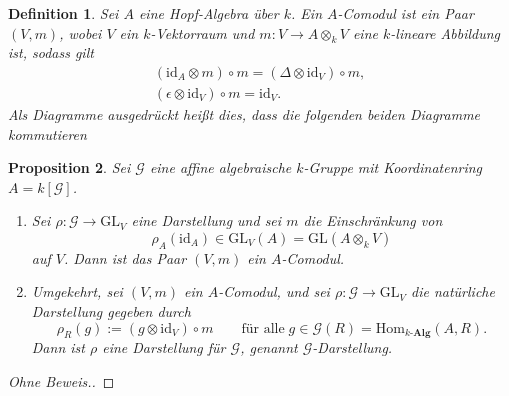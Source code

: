 \documentclass[a4paper, 11pt]{scrartcl}
\newcommand{\Hom}{\text{Hom}}
\newcommand{\id}{\text{id}}
\theoremstyle{basicstyle}
\newtheorem{definition}{Definition}[section]
\newtheorem{proposition}[definition]{Proposition}
\begin{document}
    \begin{definition}
        Sei \(A\) eine Hopf-Algebra über \(k\).
        Ein \emph{\(A\)-Comodul} ist ein Paar \((V, m)\), wobei \(V\) ein \(k\)-Vektorraum und \(m: V \to A \otimes_k V\) eine \(k\)-lineare Abbildung ist, sodass gilt %
        \begin{gather*}
            (\id_A \otimes m) \circ m = (\Delta \otimes \id_V) \circ m, \\
            (\epsilon \otimes \id_V) \circ m = \id_V.
        \end{gather*}
        Als Diagramme ausgedrückt heißt dies, dass die folgenden beiden Diagramme kommutieren
        \begin{figure*}[ht!]
            \centering
            \hspace*{4em}
        \end{figure*}
    \end{definition}

    \begin{proposition}\label{prop:2}
        Sei \(\mathcal{G}\) eine affine algebraische \(k\)-Gruppe mit Koordinatenring \(A = k[\mathcal{G}]\).
        \begin{enumerate}
            \item Sei \(\rho : \mathcal{G} \to \text{GL}_V\) eine Darstellung und sei \(m\) die Einschränkung von
                \[\rho_A(\id_A) \in \text{GL}_V(A) = \text{GL}(A \otimes_k V)\]
                auf \(V\).
                Dann ist das Paar \((V, m)\) ein \(A\)-Comodul.

            \item Umgekehrt, sei \((V, m)\) ein \(A\)-Comodul, und sei \(\rho: \mathcal{G} \to \text{GL}_V\) die \emph{natürliche Darstellung} gegeben durch
                \[\rho_R(g) := (g \otimes \id_V) \circ m \qquad \text{für alle}\; g \in \mathcal{G}(R) = \Hom_{k\textbf{-Alg}}(A, R).\]
                Dann ist \(\rho\) eine Darstellung für \(\mathcal{G}\), genannt \(\mathcal{G}\)-Darstellung.
        \end{enumerate}
    \end{proposition}
    \begin{proof}[Ohne Beweis.]
    \end{proof}
    
\end{document}
